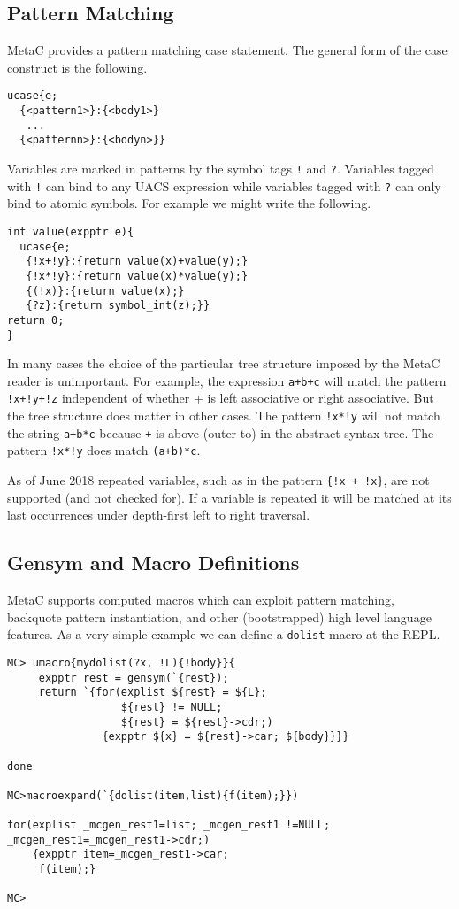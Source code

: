 \documentclass{article}
\begin{document}
\subsection{Pattern Matching}

MetaC provides a pattern matching case statement.
The general form of the case construct is the following.

\begin{verbatim}
ucase{e;
  {<pattern1>}:{<body1>}
   ...
  {<patternn>}:{<bodyn>}}
\end{verbatim}

Variables are marked in patterns by the symbol tags {\tt !} and {\tt ?}.  Variables tagged with {\tt !} can bind to any UACS expression
while variables tagged with {\tt ?} can only bind to atomic symbols.
For example we might write the following.

\begin{verbatim}
int value(expptr e){
  ucase{e;
   {!x+!y}:{return value(x)+value(y);}
   {!x*!y}:{return value(x)*value(y);}
   {(!x)}:{return value(x);}
   {?z}:{return symbol_int(z);}}
return 0;
}
\end{verbatim}

In many cases the choice of the particular tree structure imposed by the MetaC reader is unimportant.  For example, the expression {\tt a+b+c} will match the pattern
{\tt !x+!y+!z} independent of whether + is left associative or right associative.  But the tree structure does matter in other cases.  The pattern {\tt !x*!y}
will not match the string {\tt a+b*c} because {\tt +} is above (outer to) {\tt *} in the abstract syntax tree. The pattern {\tt !x*!y} does match {\tt (a+b)*c}.

As of June 2018 repeated variables, such as in the pattern {\tt \{!x + !x\}}, are not supported (and not checked for).
If a variable is repeated it will be matched at its last occurrences under depth-first left to right traversal.

\subsection{Gensym and Macro Definitions}

MetaC supports computed macros which can exploit pattern matching, backquote pattern instantiation, and other (bootstrapped) high level language features.
As a very simple example we can define a {\tt dolist} macro at the REPL.

\begin{verbatim}
MC> umacro{mydolist(?x, !L){!body}}{
     expptr rest = gensym(`{rest});
     return `{for(explist ${rest} = ${L};
                  ${rest} != NULL;
                  ${rest} = ${rest}->cdr;)
               {expptr ${x} = ${rest}->car; ${body}}}}

done

MC>macroexpand(`{dolist(item,list){f(item);}})

for(explist _mcgen_rest1=list; _mcgen_rest1 !=NULL; _mcgen_rest1=_mcgen_rest1->cdr;)
    {expptr item=_mcgen_rest1->car;
     f(item);}

MC>
\end{verbatim}
\end{document}
